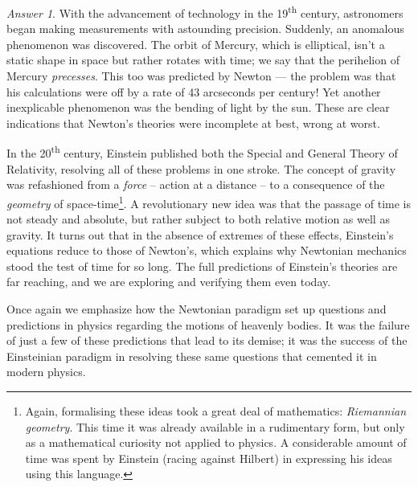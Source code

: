 \documentclass[11pt]{article}
\theoremstyle{remark}
\newtheorem*{answer}{Answer}
\begin{document}
\begin{answer}
        With the advancement of technology in the 19\textsuperscript{th} century,
        astronomers began making measurements with astounding precision. Suddenly, an
        anomalous phenomenon was discovered. The orbit of Mercury, which is
        elliptical, isn't a static shape in space but rather rotates with time; we
        say that the perihelion of Mercury \emph{precesses}. This too was predicted
        by Newton --- the problem was that his calculations were off by a rate of 43
        arcseconds per century! Yet another inexplicable phenomenon was the bending
        of light by the sun. These are clear indications that Newton's theories were
        incomplete at best, wrong at worst.

        In the 20\textsuperscript{th} century, Einstein published both the Special
        and General Theory of Relativity, resolving all of these problems in one
        stroke. The concept of gravity was refashioned from a \emph{force} -- action
        at a distance -- to a consequence of the \emph{geometry} of
        space-time\footnote{Again, formalising these ideas took a great deal of
        mathematics: \emph{Riemannian geometry}. This time it was already available
        in a rudimentary form, but only as a mathematical curiosity not applied to
        physics. A considerable amount of time was spent by Einstein (racing against
        Hilbert) in expressing his ideas using this language.}. A revolutionary new
        idea was that the passage of time is not steady and absolute, but rather
        subject to both relative motion as well as gravity. It turns out that in the
        absence of extremes of these effects, Einstein's equations reduce to those of
        Newton's, which explains why Newtonian mechanics stood the test of time for
        so long. The full predictions of Einstein's theories are far reaching, and we
        are exploring and verifying them even today.

        Once again we emphasize how the Newtonian paradigm set up questions and
        predictions in physics regarding the motions of heavenly bodies. It was the
        failure of just a few of these predictions that lead to its demise; it was
        the success of the Einsteinian paradigm in resolving these same questions
        that cemented it in modern physics.
    \end{answer}
\end{document}

